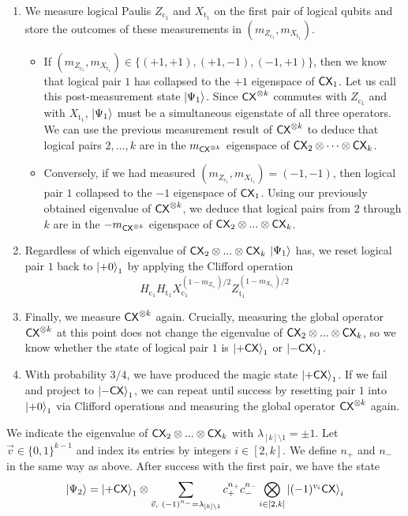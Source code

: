 \documentclass[11pt]{article}
\begin{document}
\begin{enumerate}
    \item We measure logical Paulis $Z_{\mathrm{c}_1}$ and $X_{\mathrm{t}_1}$ on the first pair of logical qubits and store the outcomes of these measurements in $(m_{Z_{\mathrm{c}_1}},m_{X_{\mathrm{t}_1}})$.
    \begin{itemize}
        \item If $(m_{Z_{\mathrm{c}_1}},m_{X_{\mathrm{t}_1}})\in \{ (+1,+1),(+1,-1),(-1,+1)\}$, then we know that logical pair $1$ has collapsed to the $+1$ eigenspace of $\mathsf{CX}_1$.
    Let us call this post-measurement state $\ket{\Psi_1}$. Since $\mathsf{CX}^{\otimes k}$ commutes with $Z_{\mathrm{c}_1}$ and with $X_{\mathrm{t}_1}$, $\ket{\Psi_1}$ must be a simultaneous eigenstate of all three operators. We can use the previous measurement result of $\mathsf{CX}^{\otimes k}$ to deduce that logical pairs $2,\dots, k$ are in the $m_{\mathsf{CX}^{\otimes k}}$ eigenspace of $\mathsf{CX}_2\otimes \dots \otimes\mathsf{CX}_k$. 
    \item Conversely, if we had measured $(m_{Z_{\mathrm{c}_1}},m_{X_{\mathrm{t}_1}})=(-1,-1)$, then logical pair $1$ collapsed to the $-1$ eigenspace of $\mathsf{CX}_1$.
    Using our previously obtained eigenvalue of $\mathsf{CX}^{\otimes k}$, we deduce that logical pairs from $2$ through $k$ are in the $-m_{\mathsf{CX}^{\otimes k}}$ eigenspace of $\mathsf{CX}_2\otimes ...\otimes\mathsf{CX}_k$. 
    \end{itemize}
    
    \item Regardless of which eigenvalue of $\mathsf{CX}_2\otimes ...\otimes\mathsf{CX}_k$ $\ket{\Psi_1}$ has, we reset logical pair $1$ back to $\ket{+0}_1$ by applying the Clifford operation $$H_{\mathrm{c}_1}H_{\mathrm{t}_1}X_{\mathrm{c}_1}^{(1-m_{Z_{\mathrm{c}_1}})/2}Z_{\mathrm{t}_1}^{(1-m_{X_{\mathrm{t}_1}})/2}$$
    \item Finally, we measure $\mathsf{CX}^{\otimes k}$ again.
    Crucially, measuring the global operator $\mathsf{CX}^{\otimes k}$ at this point does not change the eigenvalue of $\mathsf{CX}_2\otimes ...\otimes\mathsf{CX}_k$, so we know whether the state of logical pair $1$ is $\ket{+\mathsf{CX}}_1$ or $\ket{-\mathsf{CX}}_1$. 
    \item With probability $3/4$, we have produced the magic state $\ket{+\mathsf{CX}}_{1}$. If we fail and project to $\ket{-\mathsf{CX}}_{1}$, we can repeat until success by resetting pair $1$ into $\ket{+0}_{1}$ via Clifford operations and measuring the global operator $\mathsf{CX}^{\otimes k}$ again.
\end{enumerate}


We indicate the eigenvalue of $\mathsf{CX}_2\otimes ...\otimes\mathsf{CX}_k$ with $\lambda_{[k]\setminus 1}=\pm 1$. Let $\vec{v}\in \{0,1\}^{k-1}$ and index its entries by integers $i\in [2,k]$.
We define $n_+$ and $n_-$ in the same way as above.
After success with the first pair, we have the state 
\begin{align}
    \ket{\Psi_2}=\ket{+\CX}_{1}\otimes \sum_{\vec{v},\ (-1)^{n_-}=\lambda_{[k]\setminus 1}} c_+^{n_+}c_-^{n_-}\bigotimes_{i\in [2,k]} \ket{(-1)^{v_i}\CX}_i
\end{align}
\end{document}
